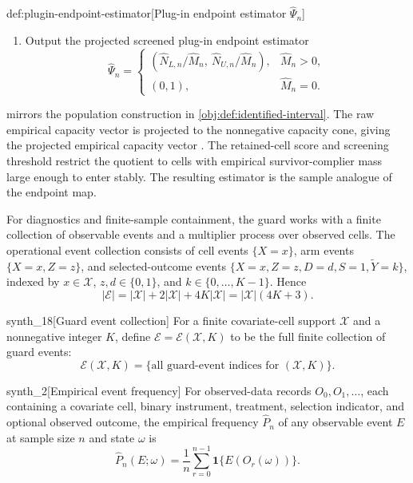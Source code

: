 \begin{algorithmv}{def:plugin-endpoint-estimator}[Plug-in endpoint estimator \(\widehat\Psi_n\)]
\begin{enumerate}
\item Output the projected screened plug-in endpoint estimator
\[
\widehat\Psi_n=
\begin{cases}
\left(\widehat N_{L,n}/\widehat M_n,\ \widehat N_{U,n}/\widehat M_n\right),
& \widehat M_n>0,\\
(0,1), & \widehat M_n=0.
\end{cases}
\]
\end{enumerate}
\end{algorithmv}

 mirrors the population construction in \cref{obj:def:identified-interval}.  The raw empirical capacity vector  is projected to the nonnegative capacity cone, giving the projected empirical capacity vector .  The retained-cell score  and screening threshold  restrict the quotient to cells with empirical survivor-complier mass large enough to enter stably.  The resulting estimator  is the sample analogue of the endpoint map.

For diagnostics and finite-sample containment, the guard works with a finite collection of observable events and a multiplier process over observed cells.  The operational event collection consists of cell events \(\{X=x\}\), arm events \(\{X=x,Z=z\}\), and selected-outcome events \(\{X=x,Z=z,D=d,S=1,\widetilde Y=k\}\), indexed by \(x\in\mathcal X\), \(z,d\in\{0,1\}\), and \(k\in\{0,\ldots,K-1\}\).  Hence
\[
|\mathcal E|=|\mathcal X|+2|\mathcal X|+4K|\mathcal X|
=|\mathcal X|(4K+3).
\]

\begin{definitionv}{synth_18}[Guard event collection]
For a finite covariate-cell support \(\mathcal X\) and a nonnegative integer \(K\), define \(\mathcal E=\mathcal E(\mathcal X,K)\) to be the full finite collection of guard events:
\[
\mathcal E(\mathcal X,K)=\{\text{all guard-event indices for }(\mathcal X,K)\}.
\]
\end{definitionv}

\begin{definitionv}{synth_2}[Empirical event frequency]
For observed-data records \(O_0,O_1,\ldots\), each containing a covariate cell, binary instrument, treatment, selection indicator, and optional observed outcome, the empirical frequency \(\widehat P_n\) of any observable event \(E\) at sample size \(n\) and state \(\omega\) is
\[
\widehat P_n(E;\omega)
=
\frac{1}{n}\sum_{r=0}^{n-1}\mathbf 1\{E(O_r(\omega))\}.
\]
\end{definitionv}

